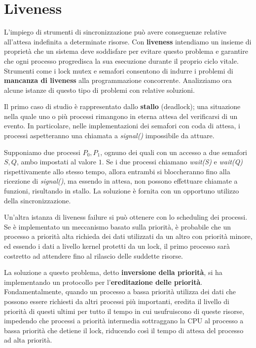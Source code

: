 \section{Liveness}
L'impiego di strumenti di sincronizzazione può avere conseguenze relative all'attesa indefinita a determinate risorse. Con \textbf{liveness} intendiamo
un insieme di proprietà che un sistema deve soddisfare per evitare questo problema e garantire che ogni processo progredisca la sua esecuzione durante
il proprio ciclo vitale. Strumenti come i lock mutex e semafori consentono di indurre i problemi di \textbf{mancanza di liveness} alla programmazione
concorrente. Analizziamo ora alcune istanze di questo tipo di problemi con relative soluzioni.\par
Il primo caso di studio è rappresentato dallo \textbf{stallo} (deadlock); una situazione nella quale uno o più processi rimangono in eterna
attesa del verificarsi di un evento. In particolare, nelle implementazioni dei semafori con coda di attesa, i processi aspetteranno una chiamata a
\textit{signal()} impossibile da attuare.\par
Supponiamo due processi $P_0, P_1$, ognuno dei quali con un accesso a due semafori $S, Q$, ambo impostati al valore $1$. Se i due processi chiamano
\textit{wait(S)} e \textit{wait(Q)} rispettivamente allo stesso tempo, allora entrambi si bloccheranno fino alla ricezione di \textit{signal()}, ma
essendo in attesa, non possono effettuare chiamate a funzioni, risultando in stallo. La soluzione è fornita con un opportuno utilizzo della
sincronizzazione.\par
Un'altra istanza di liveness failure si può ottenere con lo scheduling dei processi. Se è implementato un meccanismo basato sulla priorità, è probabile
che un processo a priorità alta richieda dei dati utilizzati da un altro con priorità minore, ed essendo i dati a livello kernel protetti da un lock,
il primo processo sarà costretto ad attendere fino al rilascio delle suddette risorse.\par
La soluzione a questo problema, detto \textbf{inversione della priorità}, si ha implementando un protocollo per l'\textbf{ereditazione delle priorità}.
Fondamentalmente, quando un processo a bassa priorità utilizza dei dati che possono essere richiesti da altri processi più importanti, eredita il
livello di priorità di questi ultimi per tutto il tempo in cui usufruiscono di queste risorse, impedendo che processi a priorità intermedia sottraggano
la CPU al processo a bassa priorità che detiene il lock, riducendo così il tempo di attesa del processo ad alta priorità.

